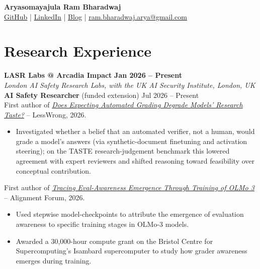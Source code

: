 \documentclass[11pt,a4paper]{article}
\begin{document}
\begin{center}
\textbf{\Large Aryasomayajula Ram Bharadwaj} \\
\vspace{4pt}
\href{https://github.com/arbdwj}{GitHub} | \href{https://www.linkedin.com/in/arbharadwaj97/}{LinkedIn} | \href{https://arbdwj.com}{Blog} | \href{mailto:ram.bharadwaj.arya@gmail.com}{ram.bharadwaj.arya@gmail.com}
\end{center}

\vspace{8pt}
\section{Research Experience}

\textbf{LASR Labs @ Arcadia Impact} \hfill \textbf{Jan 2026 -- Present} \\
\textit{London AI Safety Research Labs, with the UK AI Security Institute, London, UK} \\[2pt]
\textbf{AI Safety Researcher} (funded extension) \hfill Jul 2026 -- Present \\[1pt]
First author of \href{https://www.lesswrong.com/posts/aaEpb2s5Yjspmiyk2/does-expecting-automated-grading-degrade-models-research-2}{\textit{Does Expecting Automated Grading Degrade Models' Research Taste?}} -- LessWrong, 2026.
\begin{itemize}[leftmargin=*, nosep]
\item Investigated whether a belief that an automated verifier, not a human, would grade a model's answers (via synthetic-document finetuning and activation steering); on the TASTE research-judgement benchmark this lowered agreement with expert reviewers and shifted reasoning toward feasibility over conceptual contribution.
\end{itemize}
\vspace{2pt}
First author of \href{https://www.alignmentforum.org/posts/c2tqL9xPbttisAHtt/tracing-eval-awareness-emergence-through-training-of-olmo-3}{\textit{Tracing Eval-Awareness Emergence Through Training of OLMo 3}} -- Alignment Forum, 2026.
\begin{itemize}[leftmargin=*, nosep]
\item Used stepwise model-checkpoints to attribute the emergence of evaluation awareness  to specific training stages in OLMo-3 models.
\item Awarded a 30,000-hour compute grant on the Bristol Centre for Supercomputing's Isambard supercomputer to study how grader awareness emerges during training.
\end{itemize}
\end{document}
